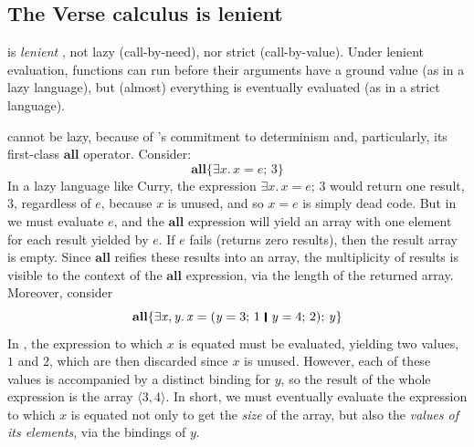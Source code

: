 \documentclass[acmsmall]{acmart}
\newcommand{\Varid}[1]{\mathit{#1}}
\begin{document}
\subsection{The Verse calculus is lenient} \label{sec:lenient}  \label{sec:laziness}

\versecalc{} is \emph{lenient} \cite{lenience},
not lazy (call-by-need), nor strict (call-by-value).
Under lenient evaluation, functions can run before their arguments have a ground value
(as in a lazy language), but (almost) everything is eventually evaluated (as in a strict language).

\versecalc{} cannot be lazy, because
of \versecalc{}'s commitment to determinism and, particularly, its first-class \ensuremath{\textbf{all}} operator.  Consider:
$$
\ensuremath{\textbf{all}\{\exists\Varid{x}.\,\Varid{x}\mathrel{=}\Varid{e};\,\mathrm{3}\}}
$$
In a lazy language like Curry, the expression \ensuremath{\exists\Varid{x}.\,\Varid{x}\mathrel{=}\Varid{e};\,\mathrm{3}} would return one result, \ensuremath{\mathrm{3}}, regardless of \ensuremath{\Varid{e}},
because \ensuremath{\Varid{x}} is unused, and so \ensuremath{\Varid{x}\mathrel{=}\Varid{e}} is simply dead code. But in \versecalc{} we must evaluate \ensuremath{\Varid{e}}, and the \ensuremath{\textbf{all}} expression will yield an array with one element
for each result yielded by \ensuremath{\Varid{e}}.  If \ensuremath{\Varid{e}} fails (returns zero results), then the result array is empty.  Since \ensuremath{\textbf{all}}
reifies these results into an array, the multiplicity of results is visible to the context of the \ensuremath{\textbf{all}} expression, via
the length of the returned array.
Moreover, consider
$$
\ensuremath{\textbf{all}\{\exists\Varid{x},\Varid{y}.\,\Varid{x}\mathrel{=}(\Varid{y}\mathrel{=}\mathrm{3};\,\mathrm{1}\hspace{0.2em}\mathop{\rule[-0.1em]{0.15em}{0.75em}}\hspace{0.2em}\Varid{y}\mathrel{=}\mathrm{4};\,\mathrm{2});\,\Varid{y}\}}
$$
In \versecalc{}, the expression to which \ensuremath{\Varid{x}} is equated must be evaluated, yielding two values, \ensuremath{\mathrm{1}} and \ensuremath{\mathrm{2}}, which are then discarded since
\ensuremath{\Varid{x}} is unused.  However, each of these
values is accompanied by a distinct binding for \ensuremath{\Varid{y}}, so the result of the whole expression is the array \ensuremath{\langle{}\mathrm{3},\mathrm{4}\rangle}.
In short, we must eventually evaluate the expression to which \ensuremath{\Varid{x}} is equated not only to get the \emph{size} of the array,
but also the \emph{values of its elements}, via the bindings of \ensuremath{\Varid{y}}.
\end{document}
